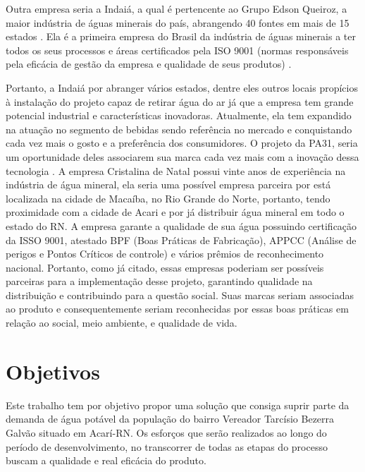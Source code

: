       Outra empresa seria a Indaiá, a qual é pertencente ao Grupo Edson Queiroz, a maior indústria de águas minerais do país, 
      abrangendo 40 fontes em mais de 15 estados \footnotemark.
      Ela é a primeira empresa do Brasil da indústria de águas minerais
      a ter todos os seus processos e áreas certificados pela ISO 9001 (normas responsáveis pela eficácia de gestão da empresa e qualidade de seus produtos) \cite{iso9001}.
      
      Portanto, a Indaiá por abranger vários estados, dentre eles outros locais propícios à instalação do projeto capaz de retirar água do ar já que a empresa tem grande potencial industrial e características inovadoras. Atualmente, ela tem expandido na
      atuação no segmento de bebidas sendo referência no mercado e conquistando cada vez mais o gosto e a preferência dos
      consumidores. O projeto da PA31, seria um oportunidade deles associarem sua marca cada vez mais com a inovação dessa
      tecnologia \footnotemark.
	A empresa Cristalina de Natal possui vinte anos de experiência na indústria de água mineral, ela seria uma possível empresa parceira por está localizada na cidade de Macaíba, no Rio Grande do Norte, portanto, tendo proximidade com a cidade de Acari e por já distribuir água mineral em todo o estado do RN\footnotemark. A empresa garante a qualidade de sua água possuindo certificação da ISSO 9001, atestado BPF (Boas Práticas de Fabricação), APPCC (Análise de perigos e Pontos Críticos de controle) e vários prêmios de reconhecimento nacional\footnotemark.
	Portanto, como já citado, essas empresas poderiam ser possíveis parceiras para a implementação desse projeto, garantindo qualidade na distribuição e contribuindo para a questão social. Suas marcas seriam associadas ao produto e consequentemente seriam reconhecidas por essas boas práticas em relação ao social, meio ambiente, e qualidade de vida.
      
      

    
\pagebreak
\section{Objetivos}

Este trabalho tem por objetivo propor uma solução que consiga suprir parte da demanda de água potável da população do bairro Vereador Tarcísio Bezerra Galvão situado em Acarí-RN. Os esforços que serão realizados ao longo do período de desenvolvimento, no transcorrer de todas as etapas do processo buscam a qualidade e real eficácia do produto.

